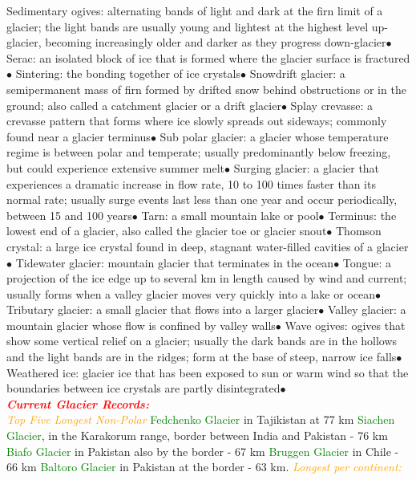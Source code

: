 \documentclass{article}
\newcommand{\ddd}{$\bullet$}
\newcommand{\red}[1]{\textcolor{red}{#1}}
\newcommand{\green}[1]{\textcolor{green}{#1}}
\newcommand{\orange}[1]{\textcolor{orange}{#1}}
\newcommand{\mysection}[1]{\\ \textbf{\textit{\red{#1}}} \\}
\newcommand{\mysub}[1]{{\textit{\orange{#1}}}}
\newcommand{\mysubsub}[1]{{{\green{#1}}}}
\begin{document}
\begin{multicols*}{4}
        Sedimentary ogives: alternating bands of light and dark at the firn limit of a glacier; the light bands are usually young and lightest at the highest level up-glacier, becoming increasingly older and darker as they progress down-glacier\ddd
        Serac: an isolated block of ice that is formed where the glacier surface is fractured\ddd
        Sintering: the bonding together of ice crystals\ddd
        Snowdrift glacier: a semipermanent mass of firn formed by drifted snow behind obstructions or in the ground; also called a catchment glacier or a drift glacier\ddd
        Splay crevasse: a crevasse pattern that forms where ice slowly spreads out sideways; commonly found near a glacier terminus\ddd
        Sub polar glacier: a glacier whose temperature regime is between polar and temperate; usually predominantly below freezing, but could experience extensive summer melt\ddd
        Surging glacier: a glacier that experiences a dramatic increase in flow rate, 10 to 100 times faster than its normal rate; usually surge events last less than one year and occur periodically, between 15 and 100 years\ddd
        Tarn: a small mountain lake or pool\ddd
        Terminus: the lowest end of a glacier, also called the glacier toe or glacier snout\ddd
        Thomson crystal: a large ice crystal found in deep, stagnant water-filled cavities of a glacier\ddd
        Tidewater glacier: mountain glacier that terminates in the ocean\ddd
        Tongue: a projection of the ice edge up to several km in length caused by wind and current; usually forms when a valley glacier moves very quickly into a lake or ocean\ddd
        Tributary glacier: a small glacier that flows into a larger glacier\ddd
        Valley glacier: a mountain glacier whose flow is confined by valley walls\ddd
        Wave ogives: ogives that show some vertical relief on a glacier; usually the dark bands are in the hollows and the light bands are in the ridges; form at the base of steep, narrow ice falls\ddd
        Weathered ice: glacier ice that has been exposed to sun or warm wind so that the boundaries between ice crystals are partly disintegrated\ddd
	    \mysection{Current Glacier Records:} 
	    \mysub{Top Five Longest Non-Polar}
	    \mysubsub {Fedchenko Glacier} in Tajikistan at 77 km
	    \mysubsub {Siachen Glacier}, in the Karakorum range, border between India and Pakistan - 76 km
	    \mysubsub {Biafo Glacier} in Pakistan also by the border - 67 km
	    \mysubsub {Bruggen Glacier} in Chile - 66 km
	    \mysubsub {Baltoro Glacier} in Pakistan at the border - 63 km. \mysub{Longest per continent: } 

\end{multicols*}
\end{document}

